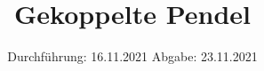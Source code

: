

\subject{V106}
\title{Gekoppelte Pendel}
\date{%
  Durchführung: 16.11.2021
  \hspace{3em}
  Abgabe: 23.11.2021
}



\maketitle
\thispagestyle{empty}
\tableofcontents
\newpage




\newpage




\printbibliography{}


